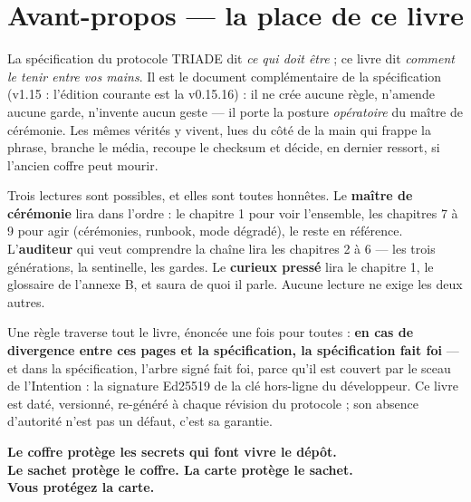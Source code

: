 \section*{Avant-propos — la place de ce livre}\label{sec:avantpropos}


La spécification du protocole TRIADE dit \emph{ce qui doit être} ; ce livre dit
\emph{comment le tenir entre vos mains}. Il est le document complémentaire de la
spécification (v1.15 : l'édition courante est la v0.15.16) : il ne crée aucune règle,
n'amende aucune garde, n'invente aucun geste
— il porte la posture \emph{opératoire} du maître de cérémonie. Les mêmes vérités y
vivent, lues du côté de la main qui frappe la phrase, branche le média, recoupe le
checksum et décide, en dernier ressort, si l'ancien coffre peut mourir.

Trois lectures sont possibles, et elles sont toutes honnêtes. Le \textbf{maître de
cérémonie} lira dans l'ordre : le chapitre 1 pour voir l'ensemble, les chapitres 7 à 9
pour agir (cérémonies, runbook, mode dégradé), le reste en référence. L'\textbf{auditeur}
qui veut comprendre la chaîne lira les chapitres 2 à 6 — les trois générations, la
sentinelle, les gardes. Le \textbf{curieux pressé} lira le chapitre 1, le glossaire de
l'annexe B, et saura de quoi il parle. Aucune lecture ne exige les deux autres.

Une règle traverse tout le livre, énoncée une fois pour toutes : \textbf{en cas de
divergence entre ces pages et la spécification, la spécification fait foi} — et dans la
spécification, l'arbre signé  fait foi, parce qu'il est couvert par le
sceau de l'Intention : la signature Ed25519 de la clé hors-ligne du développeur. Ce
livre est daté, versionné, re-généré à chaque révision du protocole ; son absence
d'autorité n'est pas un défaut, c'est sa garantie.

\bigskip

\begin{center}
\large\bfseries Le coffre protège les secrets qui font vivre le dépôt.\\
Le sachet protège le coffre. La carte protège le sachet.\\
Vous protégez la carte.
\end{center}

